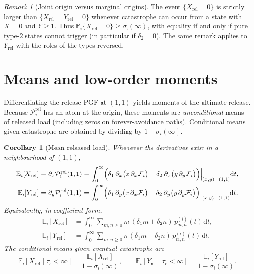 \documentclass[11pt]{article}
\newcommand{\Prob}{\mathbb P}
\newcommand{\E}{\mathbb E}
\newcommand{\dd}{\mathrm d}
\newcommand{\Xrel}{X_{\mathrm{rel}}}
\newcommand{\Yrel}{Y_{\mathrm{rel}}}
\theoremstyle{plain}
\newtheorem{corollary}{Corollary}
\theoremstyle{definition}
\theoremstyle{remark}
\newtheorem{remark}{Remark}
\begin{document}
\begin{remark}[Joint origin versus marginal origins]
The event $\{\Xrel=0\}$ is strictly larger than $\{\Xrel=\Yrel=0\}$ whenever catastrophe can
occur from a state with $X=0$ and $Y\ge 1$. Thus
$\Prob_i\{\Xrel=0\}\ge\sigma_i(\infty)$, with equality if and only if pure type-$2$ states cannot
trigger (in particular if $\delta_2=0$). The same remark applies to $\Yrel$ with the roles of the
types reversed.
\end{remark}

\section{Means and low-order moments}

Differentiating the release PGF at $(1,1)$ yields moments of the ultimate release.
Because $\mathcal P_i^{\mathrm{rel}}$ has an atom at the origin, these moments are
\emph{unconditional} means of released load (including zeros on forever-avoidance paths).
Conditional means given catastrophe are obtained by dividing by $1-\sigma_i(\infty)$.

\begin{corollary}[Mean released load]
\label{cor:means}
Whenever the derivatives exist in a neighbourhood of $(1,1)$,
\begin{align}
\E_i[\Xrel]
&=
\partial_x\mathcal P_i^{\mathrm{rel}}(1,1)
=
\int_0^\infty
\Bigl(
\delta_1\,
\partial_x\bigl(x\,\partial_x\mathcal F_i\bigr)
+
\delta_2\,
\partial_x\bigl(y\,\partial_y\mathcal F_i\bigr)
\Bigr)
\Big|_{(x,y)=(1,1)}
\dd t,
\label{eq:mean-X}
\\
\E_i[\Yrel]
&=
\partial_y\mathcal P_i^{\mathrm{rel}}(1,1)
=
\int_0^\infty
\Bigl(
\delta_1\,
\partial_y\bigl(x\,\partial_x\mathcal F_i\bigr)
+
\delta_2\,
\partial_y\bigl(y\,\partial_y\mathcal F_i\bigr)
\Bigr)
\Big|_{(x,y)=(1,1)}
\dd t.
\label{eq:mean-Y}
\end{align}
Equivalently, in coefficient form,
\begin{align}
\E_i[\Xrel]
&=
\int_0^\infty
\sum_{m,n\ge 0}
m\,(\delta_1 m+\delta_2 n)\,
p_{m,n}^{(i)}(t)\,
\dd t,
\label{eq:mean-X-sum}
\\
\E_i[\Yrel]
&=
\int_0^\infty
\sum_{m,n\ge 0}
n\,(\delta_1 m+\delta_2 n)\,
p_{m,n}^{(i)}(t)\,
\dd t.
\label{eq:mean-Y-sum}
\end{align}
The conditional means given eventual catastrophe are
\begin{equation}
\label{eq:cond-means}
\E_i[\Xrel\mid\tau_c<\infty]
=
\frac{\E_i[\Xrel]}{1-\sigma_i(\infty)},
\qquad
\E_i[\Yrel\mid\tau_c<\infty]
=
\frac{\E_i[\Yrel]}{1-\sigma_i(\infty)}.
\end{equation}
\end{corollary}
\end{document}
